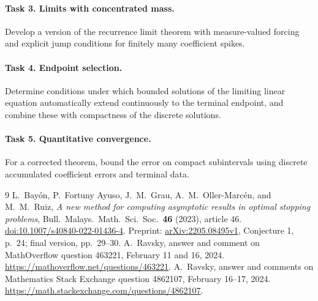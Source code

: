 \documentclass[11pt]{article}
\begin{document}
\paragraph{Task 3. Limits with concentrated mass.}
Develop a version of the recurrence limit theorem with measure-valued
forcing and explicit jump conditions for finitely many coefficient spikes.
\paragraph{Task 4. Endpoint selection.}
Determine conditions under which bounded solutions of the limiting
linear equation automatically extend continuously to the terminal endpoint,
and combine these with compactness of the discrete solutions.
\paragraph{Task 5. Quantitative convergence.}
For a corrected theorem, bound the error on compact subintervals using
discrete accumulated coefficient errors and terminal data.

\begin{thebibliography}{9}
L.~Bay\'on, P.~Fortuny Ayuso, J.~M.~Grau, A.~M.~Oller-Marc\'en,
and M.~M.~Ruiz,
\emph{A new method for computing asymptotic results in optimal stopping
problems}, Bull.\ Malays.\ Math.\ Sci.\ Soc.\ \textbf{46} (2023), article 46.
\href{https://doi.org/10.1007/s40840-022-01436-4}{doi:10.1007/s40840-022-01436-4}.
Preprint: \href{https://arxiv.org/abs/2205.08495}{arXiv:2205.08495v1},
Conjecture 1, p.~24; final version, pp.~29--30.
A.~Ravsky, answer and comment on MathOverflow question 463221,
February 11 and 16, 2024.
\url{https://mathoverflow.net/questions/463221}.
A.~Ravsky, answer and comments on Mathematics Stack Exchange
question 4862107, February 16--17, 2024.
\url{https://math.stackexchange.com/questions/4862107}.
\end{thebibliography}
\end{document}
